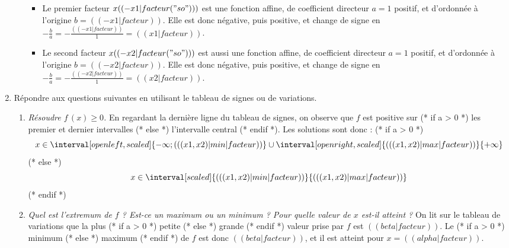 \begin{enumerate}
\begin{enumerate}
\begin{itemize}
\item Le premier facteur $x (( -x1|facteur("so") ))$ est une fonction affine, de coefficient directeur $a=1$ positif, et d'ordonnée à l'origine $b=(( -x1|facteur ))$. Elle est donc négative, puis positive, et change de signe en $-\frac{b}{a}=-\frac{(( -x1|facteur ))}{1}=(( x1|facteur ))$.
\item Le second facteur $x (( -x2|facteur("so") ))$ est aussi une fonction affine, de coefficient directeur $a=1$ positif, et d'ordonnée à l'origine $b=(( -x2|facteur ))$. Elle est donc négative, puis positive, et change de signe en $-\frac{b}{a}=-\frac{(( -x2|facteur ))}{1}=(( x2|facteur ))$.
\end{itemize}
\begin{center}
\end{center}
\end{enumerate}
\item Répondre aux questions suivantes en utilisant le tableau de signes ou de variations.
\begin{enumerate}
\item \emph{Résoudre $f\,(x)\geqslant0$.} En regardant la dernière ligne du tableau de signes, on observe que $f$ est positive sur
(* if a > 0 *) les premier et dernier intervalles (* else *) l'intervalle central (* endif *).
Les solutions sont donc :
(* if a > 0 *)
   \[ x\in\interval[open left, scaled]{-\infty; (( (x1, x2)|min|facteur ))} \cup \interval[open right, scaled]{(( (x1, x2)|max|facteur ))}{+\infty} \]
(* else *)
   \[ x\in\interval[scaled]{(( (x1, x2)|min|facteur ))}{(( (x1, x2)|max|facteur ))} \]
(* endif *)
\item \emph{Quel est l'extremum de $f$ ? Est-ce un maximum ou un minimum ? Pour quelle valeur de $x$ est-il atteint ?} On lit sur le tableau de variations que la plus
(* if a > 0 *) petite (* else *) grande (* endif *)
valeur prise par $f$ est $(( beta|facteur ))$. Le
(* if a > 0 *) minimum (* else *) maximum (* endif *)
de $f$ est donc $(( beta|facteur ))$, et il est atteint pour $x=(( alpha|facteur ))$.
\end{enumerate}
\end{enumerate}
